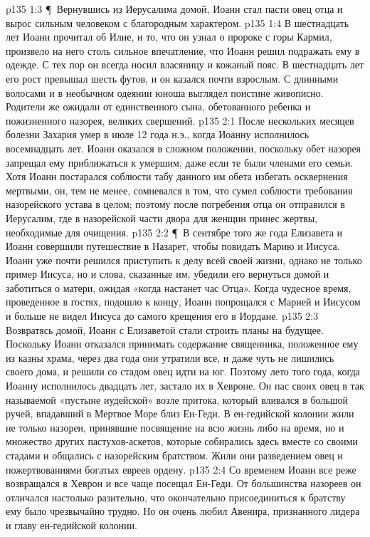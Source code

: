 \vs p135 1:3 \P\ Вернувшись из Иерусалима домой, Иоанн стал пасти овец отца и вырос сильным человеком с благородным характером.
\vs p135 1:4 В шестнадцать лет Иоанн прочитал об Илие, и то, что он узнал о пророке с горы Кармил, произвело на него столь сильное впечатление, что Иоанн решил подражать ему в одежде. С тех пор он всегда носил власяницу и кожаный пояс. В шестнадцать лет его рост превышал шесть футов, и он казался почти взрослым. С длинными волосами и в необычном одеянии юноша выглядел поистине живописно. Родители же ожидали от единственного сына, обетованного ребенка и пожизненного назорея, великих свершений.
\vs p135 2:1 После нескольких месяцев болезни Захария умер в июле 12 года н.э., когда Иоанну исполнилось восемнадцать лет. Иоанн оказался в сложном положении, поскольку обет назорея запрещал ему приближаться к умершим, даже если те были членами его семьи. Хотя Иоанн постарался соблюсти табу данного им обета избегать осквернения мертвыми, он, тем не менее, сомневался в том, что сумел соблюсти требования назорейского устава в целом; поэтому после погребения отца он отправился в Иерусалим, где в назорейской части двора для женщин принес жертвы, необходимые для очищения.
\vs p135 2:2 \P\ В сентябре того же года Елизавета и Иоанн совершили путешествие в Назарет, чтобы повидать Марию и Иисуса. Иоанн уже почти решился приступить к делу всей своей жизни, однако не только пример Иисуса, но и слова, сказанные им, убедили его вернуться домой и заботиться о матери, ожидая «когда настанет час Отца». Когда чудесное время, проведенное в гостях, подошло к концу, Иоанн попрощался с Марией и Иисусом и больше не видел Иисуса до самого крещения его в Иордане.
\vs p135 2:3 Возвратясь домой, Иоанн с Елизаветой стали строить планы на будущее. Поскольку Иоанн отказался принимать содержание священника, положенное ему из казны храма, через два года они утратили все, и даже чуть не лишились своего дома, и решили со стадом овец идти на юг. Поэтому лето того года, когда Иоанну исполнилось двадцать лет, застало их в Хевроне. Он пас своих овец в так называемой «пустыне иудейской» возле притока, который вливался в большой ручей, впадавший в Мертвое Море близ Ен\hyp{}Геди. В ен\hyp{}гедийской колонии жили не только назореи, принявшие посвящение на всю жизнь либо на время, но и множество других пастухов\hyp{}аскетов, которые собирались здесь вместе со своими стадами и общались с назорейским братством. Жили они разведением овец и пожертвованиями богатых евреев ордену.
\vs p135 2:4 Со временем Иоанн все реже возвращался в Хеврон и все чаще посещал Ен\hyp{}Геди. От большинства назореев он отличался настолько разительно, что окончательно присоединиться к братству ему было чрезвычайно трудно. Но он очень любил Авенира, признанного лидера и главу ен\hyp{}гедийской колонии.
